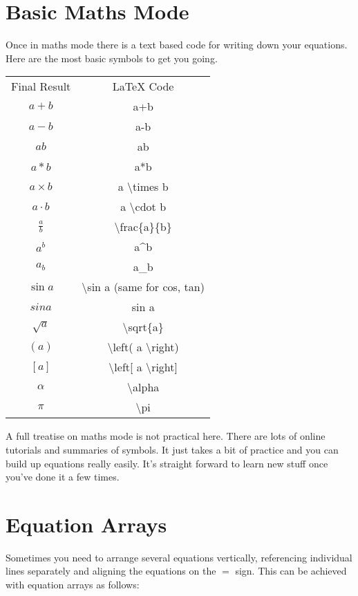 \section{Basic Maths Mode}
Once in maths mode there is a text based code for writing down your equations.  Here are the most basic symbols to get you going.
\begin{center}
\begin{tabular}{cc}
\toprule
Final Result & LaTeX Code \\
\cmidrule(){1-2}
$a+b$ & a+b \\
$a-b$ & a-b \\
$ab$ & ab \\
$a*b$ & a*b \\
$a \times b$ & a {\textbackslash}times b \\
$a \cdot b$ & a {\textbackslash}cdot b \\
$\frac{a}{b}$ & {\textbackslash}frac\{a\}\{b\} \\ 
$a^b$ & a\textasciicircum{}b \\
$a_b$ & a\_b \\
$\sin a$ & {\textbackslash}sin a  (same for cos, tan)\\
$ sin a$ & sin a \\
$\sqrt{a}$ & {\textbackslash}sqrt\{a\} \\
$\left( a \right) $ & {\textbackslash}left( a {\textbackslash}right)\\ 
$\left[ a \right]$ & {\textbackslash}left[ a {\textbackslash}right]\\ 
$\alpha$ & {\textbackslash}alpha \\
$\pi$ & {\textbackslash}pi \\
\bottomrule
\end{tabular}
\end{center}

A full treatise on maths mode is not practical here. There are lots of online tutorials and summaries of symbols. It just takes a bit of practice and you can build up equations really easily. It's straight forward to learn new stuff once you've done it a few times.

\pagebreak
\section{Equation Arrays}
Sometimes you need to arrange several equations vertically, referencing individual lines separately and aligning the equations on the $=$ sign. This can be achieved with equation arrays as follows:

